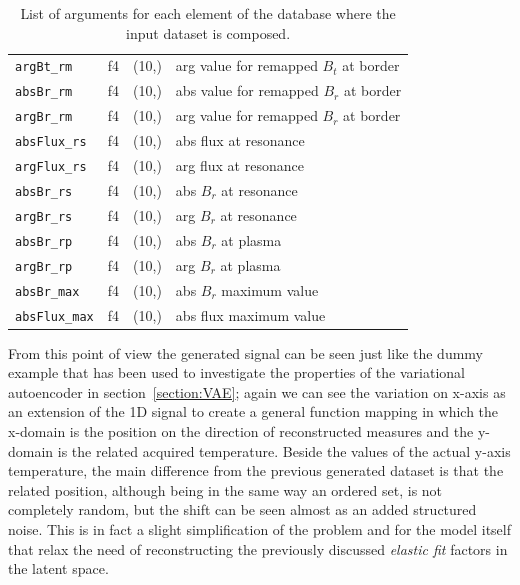 \begin{table}[]
\begin{tabular}{l|l|l|l}
\verb|argBt_rm   | & f4         & (10,)     &   arg value for remapped $B_t$ at border              \\
\verb|absBr_rm   | & f4         & (10,)     &   abs value for remapped $B_r$ at border              \\
\verb|argBr_rm   | & f4         & (10,)     &   arg value for remapped $B_r$ at border              \\
\verb|absFlux_rs | & f4         & (10,)     &   abs flux at resonance                               \\
\verb|argFlux_rs | & f4         & (10,)     &   arg flux at resonance                               \\
\verb|absBr_rs   | & f4         & (10,)     &   abs $B_r$ at resonance                              \\
\verb|argBr_rs   | & f4         & (10,)     &   arg $B_r$ at resonance                              \\
\verb|absBr_rp   | & f4         & (10,)     &   abs $B_r$ at plasma                                 \\
\verb|argBr_rp   | & f4         & (10,)     &   arg $B_r$ at plasma                                 \\
\verb|absBr_max  | & f4         & (10,)     &   abs $B_r$ maximum value                             \\
\verb|absFlux_max| & f4         & (10,)     &   abs flux maximum value
    \end{tabular}
    \caption{List of arguments for each element of the database where the input dataset is composed. }
    \label{tab:database}
\end{table}
From this point of view the generated signal can be seen just like the dummy example that has been used to investigate the properties of the variational autoencoder in section~\cref{section:VAE}; again we can see the variation on x-axis as an extension of the 1D signal to create a general function mapping in which the x-domain is the position on the direction of reconstructed measures and the y-domain is the related acquired temperature.
Beside the values of the actual y-axis temperature, the main difference from the previous generated dataset is that the related position, although being in the same way an ordered set, is not completely random, but the shift can be seen almost as an added structured noise.
This is in fact a slight simplification of the problem and for the model itself that relax the need of reconstructing the previously discussed \textit{elastic fit} factors in the latent space.
